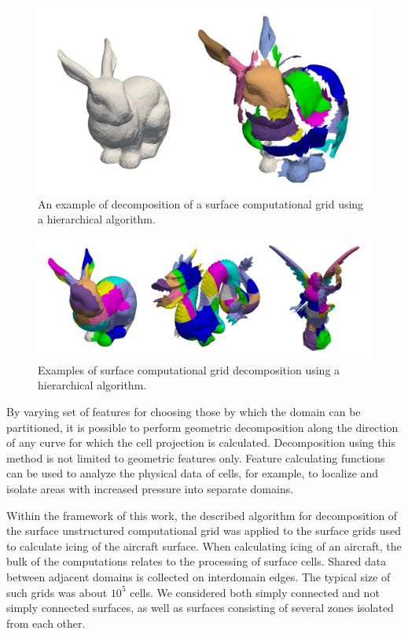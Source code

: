 \documentclass[
11pt,%
tightenlines,%
twoside,%
onecolumn,%
nofloats,%
nobibnotes,%
nofootinbib,%
superscriptaddress,%
noshowpacs,%
centertags]%
{revtex4}
\begin{document}
\begin{figure}[h]
\includegraphics[width=1.0\textwidth]{pics/03-explode-bunny.pdf}
\caption{An example of decomposition of a surface computational grid using a hierarchical algorithm.}\label{fig:03-explode-bunny}
\end{figure}

\begin{figure}[h]
\includegraphics[width=1.0\textwidth]{pics/03-hierarch.pdf}
\caption{Examples of surface computational grid decomposition using a hierarchical algorithm.}\label{fig:03-hierarch}
\end{figure}

By varying set of features for choosing those by which the domain can be partitioned, it is possible to perform geometric decomposition along the direction of any curve for which the cell projection is calculated.
Decomposition using this method is not limited to geometric features only.
Feature calculating functions can be used to analyze the physical data of cells, for example, to localize and isolate areas with increased pressure into separate domains.

Within the framework of this work, the described algorithm for decomposition of the surface unstructured computational grid was applied to the surface grids used to calculate icing of the aircraft surface.
When calculating icing of an aircraft, the bulk of the computations relates to the processing of surface cells.
Shared data between adjacent domains is collected on interdomain edges.
The typical size of such grids was about $ 10^5 $ cells. We considered both simply connected and not simply connected surfaces, as well as surfaces consisting of several zones isolated from each other.
\end{document}
